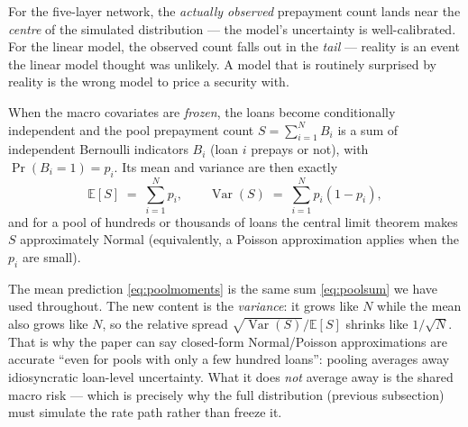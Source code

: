 \documentclass[11pt]{article}
\newcommand{\E}{\mathbb{E}}
\begin{document}
\begin{intuition}
For the five-layer network, the \emph{actually observed} prepayment count lands near the
\emph{centre} of the simulated distribution --- the model's uncertainty is well-calibrated.
For the linear model, the observed count falls out in the \emph{tail} --- reality is an event
the linear model thought was unlikely. A model that is routinely surprised by reality is the
wrong model to price a security with.
\end{intuition}

When the macro covariates are \emph{frozen}, the loans become conditionally independent and
the pool prepayment count $S = \sum_{i=1}^N B_i$ is a sum of independent Bernoulli indicators
$B_i$ (loan $i$ prepays or not), with $\Pr(B_i=1)=p_i$. Its mean and variance are then
exactly
\begin{equation}
  \E[S] \;=\; \sum_{i=1}^N p_i,
  \qquad
  \operatorname{Var}(S) \;=\; \sum_{i=1}^N p_i(1-p_i),
  \label{eq:poolmoments}
\end{equation}
and for a pool of hundreds or thousands of loans the central limit theorem makes $S$
approximately Normal (equivalently, a Poisson approximation applies when the $p_i$ are small).

\begin{derivation}
The mean prediction \eqref{eq:poolmoments} is the same sum \eqref{eq:poolsum} we have used
throughout. The new content is the \emph{variance}: it grows like $N$ while the mean also
grows like $N$, so the relative spread $\sqrt{\operatorname{Var}(S)}/\E[S]$ shrinks like
$1/\sqrt{N}$. That is why the paper can say closed-form Normal/Poisson approximations are
accurate ``even for pools with only a few hundred loans'': pooling averages away
idiosyncratic loan-level uncertainty. What it does \emph{not} average away is the shared
macro risk --- which is precisely why the full distribution (previous subsection) must
simulate the rate path rather than freeze it.
\end{derivation}
\end{document}

